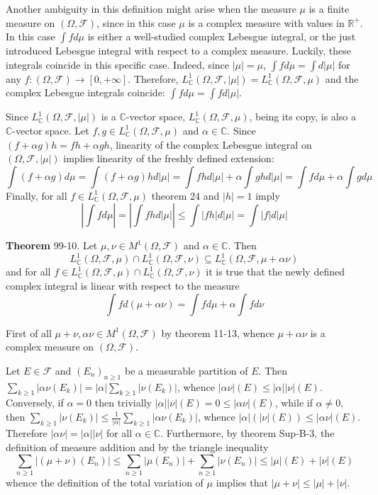\documentclass[a4paper]{article}
\newcommand{\clo}[1]{\left [ #1 \right ]}
\newcommand{\brac}[1]{\left ( #1 \right )}
\newcommand{\abs}[1]{\left | #1 \right |}
\newcommand{\Real}{\mathbb{R}}
\newcommand{\Zinf}{\clo{ 0, +\infty }}
\newcommand{\Cplx}{\mathbb{C}}
\newcommand{\Fcal}{\mathcal{F}}
\begin{document}
Another ambiguity in this definition might arise when the measure $\mu$ is a finite measure on $\brac{\Omega, \Fcal}$, since in this case $\mu$ is a complex measure with values in $\Real^+$. In this case $\int f d\mu$ is either a well-studied complex Lebesgue integral, or the just introduced Lebesgue integral with respect to a complex measure. Luckily, these integrals coincide in this specific case. Indeed, since $\abs{\mu}=\mu$, $\int f d\mu = \int d\abs{\mu}$ for any $f:\brac{\Omega, \Fcal}\to \Zinf$. Therefore, $L^1_\Cplx\brac{\Omega, \Fcal, \abs{\mu}} = L^1_\Cplx\brac{\Omega, \Fcal, \mu}$ and the complex Lebesgue integrals coincide: $\int f d\mu = \int f d\abs{\mu}$.

Since $L^1_\Cplx\brac{\Omega, \Fcal, \abs{\mu}}$ is a $\Cplx$-vector space, $L^1_\Cplx\brac{\Omega, \Fcal, \mu}$, being its copy, is also a $\Cplx$-vector space. Let $f,g\in L^1_\Cplx\brac{\Omega, \Fcal, \mu}$ and $\alpha\in \Cplx$. Since $\brac{f + \alpha g} h = f h + \alpha g h$, linearity of the complex Lebesgue integral on $\brac{\Omega, \Fcal, \abs{\mu}}$ implies linearity of the freshly defined extension: \[\int \brac{f + \alpha g} d\mu = \int \brac{f + \alpha g} h d\abs{\mu} = \int f h d\abs{\mu} + \alpha \int g h d\abs{\mu} = \int f d\mu + \alpha \int g d\mu\] Finally, for all $f\in L^1_\Cplx\brac{\Omega, \Fcal, \mu}$ theorem 24 and $\abs{h}=1$ imply \[\abs{\int f d\mu} = \abs{\int f h d\abs{\mu}} \leq \int \abs{f h} d\abs{\mu} = \int \abs{f} d\abs{\mu}\]

\label{thm:cplx_meas_sum_cplx_int} \noindent \textbf{Theorem} 99-10.
Let $\mu, \nu\in M^1\brac{\Omega, \Fcal}$ and $\alpha\in \Cplx$. Then \[L^1_\Cplx\brac{\Omega, \Fcal, \mu}\cap L^1_\Cplx\brac{\Omega, \Fcal, \nu} \subseteq L^1_\Cplx\brac{\Omega, \Fcal, \mu+\alpha \nu}\] and for all $f\in L^1_\Cplx\brac{\Omega, \Fcal, \mu}\cap L^1_\Cplx\brac{\Omega, \Fcal, \nu}$ it is true that the newly defined complex integral is linear with respect to the measure\[\int f d\brac{\mu+\alpha\nu} = \int f d\mu + \alpha \int f d\nu\]

First of all $\mu+\nu, \alpha \nu \in M^1\brac{\Omega, \Fcal}$ by theorem 11-13, whence $\mu+\alpha \nu$ is a complex measure on $\brac{\Omega, \Fcal}$.

Let $E\in \Fcal$ and $\brac{E_n}_{n\geq1}$ be a measurable partition of $E$. Then $\sum_{k\geq1} \abs{\alpha \nu\brac{E_k}} = \abs{\alpha} \sum_{k\geq 1} \abs{\nu\brac{E_k}}$, whence $\abs{\alpha \nu}\brac{E}\leq \abs{\alpha}\abs{\nu}\brac{E}$. Conversely, if $\alpha=0$ then trivially $\abs{\alpha}\abs{\nu}\brac{E} = 0 \leq \abs{\alpha \nu}\brac{E}$, while if $\alpha\neq 0$, then $\sum_{k\geq 1}\abs{\nu\brac{E_k}}\leq \frac{1}{\abs{\alpha}} \sum_{k\geq1} \abs{\alpha \nu\brac{E_k}}$, whence $\abs{\alpha}\brac{\abs{\nu}\brac{E}} \leq \abs{\alpha \nu}\brac{E}$. Therefore $\abs{\alpha \nu}=\abs{\alpha} \abs{\nu}$ for all $\alpha\in \Cplx$. Furthermore, by theorem Sup-B-3, the definition of measure addition and by the triangle inequality \[\sum_{n\geq1} \abs{\brac{\mu+\nu}\brac{E_n}}\leq \sum_{n\geq1} \abs{\mu\brac{E_n}} + \sum_{n\geq1} \abs{\nu\brac{E_n}}\leq \abs{\mu}\brac{E} + \abs{\nu}\brac{E}\] whence the definition of the total variation of $\mu$ implies that $\abs{\mu+\nu}\leq \abs{\mu}+\abs{\nu}$.
\end{document}
